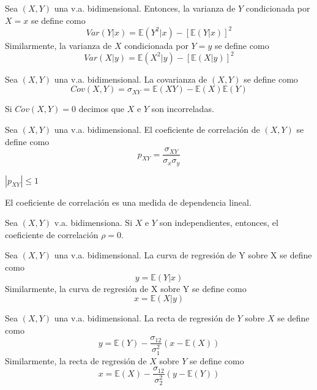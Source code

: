 \begin{defn}
Sea $(X,Y)$ una v.a. bidimensional. Entonces, la varianza de $Y$ condicionada por $X=x$ se define como \[ Var(Y|x) = \mathbb{E}(Y^2|x) - [\mathbb{E}(Y|x)]^2 \] Similarmente, la varianza de $X$ condicionada por $Y=y$ se define como \[ Var(X|y) = \mathbb{E}(X^2|y) - [\mathbb{E}(X|y)]^2 \]
\end{defn}

\begin{defn}[Covarianza]
Sea $(X,Y)$ una v.a. bidimensional. La covarianza de $(X,Y)$ se define como \[ Cov(X,Y) = \sigma_{XY} = \mathbb{E}(XY) -\mathbb{E}(X)\mathbb{E}(Y)\]
\end{defn}

\begin{obs}
Si $Cov(X,Y) = 0$ decimos que $X$ e $Y$ son incorreladas.
\end{obs}

\begin{defn}
Sea $(X,Y)$ una v.a. bidimensional. El coeficiente de correlación de $(X,Y)$ se define como \[ p_{XY} = \frac{\sigma_{XY}}{\sigma_x \sigma_y} \]
\end{defn}

\begin{obs}
$|p_{XY}|\leq 1$
\end{obs}

\begin{obs}
El coeficiente de correlación es una medida de dependencia lineal.
\end{obs}

\begin{prop}
  Sea $(X,Y)$ v.a. bidimensiona. Si $X$ e $Y$ son independientes, entonces, el coeficiente de correlación $\rho = 0$.
\end{prop}

\begin{defn}
Sea $(X,Y)$ una v.a. bidimensional. La curva de regresión de Y sobre X se define como \[ y = \mathbb{E}(Y|x) \] Similarmente, la curva de regresión de X sobre Y se define como \[ x = \mathbb{E}(X|y) \]
\end{defn}

\begin{defn}
Sea $(X,Y)$ una v.a. bidimensional. La recta de regresión de $Y$ sobre $X$ se define como \[ y = \mathbb{E}(Y) - \frac{\sigma_{12}}{\sigma_{1}^2}(x - \mathbb{E}(X)) \] Similarmente, la recta de regresión de $X$ sobre $Y$ se define como \[ x = \mathbb{E}(X) - \frac{\sigma_{12}}{\sigma_{2}^2}(y-\mathbb{E}(Y)) \]
\end{defn}


